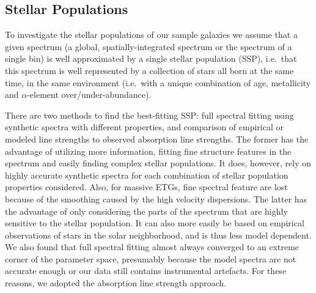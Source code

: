 	 \subsection{Stellar Populations}
	 	\label{subsec:PopFit}
	 	To investigate the stellar populations of our sample galaxies we assume that a given spectrum (a global, spatially-integrated spectrum or the spectrum of a single bin) is well approximated by a single stellar population (SSP), i.e.\ that this spectrum is well represented by a collection of stars all born at the same time, in the same environment (i.e.\ with a unique combination of age, metallicity and $\alpha$-element over/under-abundance). 

	 	There are two methods to find the best-fitting SSP: full spectral fitting using synthetic spectra with different properties, and comparison of empirical or modeled line strengths to observed absorption line strengths. The former has the advantage of utilizing more information, fitting fine structure features in the spectrum and easily finding complex stellar populations. It does, however, rely on highly accurate synthetic spectra for each combination of stellar population properties considered. Also, for massive ETGs, fine spectral feature are lost because of the smoothing caused by the high velocity dispersions. The latter has the advantage of only considering the parts of the spectrum that are highly sensitive to the stellar population. It can also more easily be based on empirical observations of stars in the solar neighborhood, and is thus less model dependent.
	 	We also found that full spectral fitting almost always converged to an extreme corner of the parameter space, presumably because the model spectra are not accurate enough or our data still contains instrumental artefacts. For these reasons, we adopted the absorption line strength approach.

